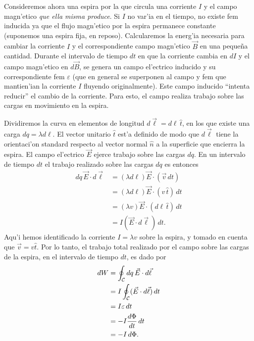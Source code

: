 Consideremos ahora una espira por la que circula una corriente $I$ y el campo magn'etico \textit{que ella misma produce}. Si $I$ no var'ia en el tiempo, no existe fem inducida ya que el flujo magn'etico por la espira permanece constante (suponemos una espira fija, en reposo). Calcularemos la energ'ia necesaria para cambiar la corriente $I$ y el correspondiente campo magn'etico $\vec{B}$ en una peque\~na cantidad. Durante el intervalo de tiempo $dt$ en que la corriente cambia en $dI$ y el campo magn'etico en $d\vec{B}$, se genera un campo el'ectrico inducido y su correspondiente fem $\varepsilon$ (que en general se superponen al campo y fem que mantien'ian la corriente $I$ fluyendo originalmente). Este campo inducido ``intenta reducir'' el cambio de la corriente. Para esto, el campo realiza trabajo sobre las cargas en movimiento en la espira. 

Dividiremos la curva en elementos de longitud $d\vec{\ell}=d\ell \,\hat{t}$, en los que existe una carga $dq=\lambda d\ell$. El vector unitario $\hat{t}$ est'a definido de modo que $d\vec{\ell}$ tiene la orientaci'on standard respecto al vector normal $\hat{n}$ a la superficie que encierra la espira. El campo el'ectrico $\vec{E}$ ejerce trabajo sobre las cargas $dq$. En un intervalo de tiempo $dt$ el trabajo realizado sobre las cargas $dq$ es entonces 
\begin{align}
dq\,\vec{E}\cdot d\vec{\ell} &= (\lambda d\ell) \vec{E}\cdot (\vec{v}\,dt) \\
&= (\lambda d\ell) \vec{E}\cdot (v\,\hat{t})\,dt \\
&= (\lambda v) \vec{E}\cdot (d\ell\,\hat{t})\,dt \\
&= I(\vec{E}\cdot d\vec{\ell})\,dt.
\end{align}
Aqu'i hemos identificado la corriente $I=\lambda v$ sobre la espira, y tomado en cuenta que $\vec{v}=v\hat{t}$. Por lo tanto, el trabajo total realizado por el campo sobre las cargas de la espira, en el intervalo de tiempo $dt$, es dado por
\begin{align}
dW &= \oint_{\cal C}dq\,\vec{E}\cdot d\vec{\ell} \\
&= I\oint_{\cal C}(\vec{E}\cdot d\vec{\ell})\,dt \\
&= I\varepsilon\,dt \\
&= -I\frac{d\Phi}{dt}\,dt \\
&= -I\,d\Phi.
\end{align}

